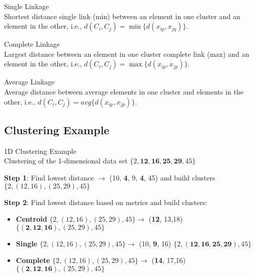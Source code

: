 \begin{definition}{Single Linkage}\\
Shortest distance single link (min) between an element in one cluster and an element in the other, i.e., $d(C_i, C_j) = \min\{d(x_{ip}, x_{jq})\}$.
\end{definition}

\begin{definition}{Complete Linkage}\\
Largest distance between an element in one cluster complete link (max) and an element in the other, i.e., $d(C_i, C_j) = \max\{d(x_{ip}, x_{jp})\}$.
\end{definition}

\begin{definition}{Average Linkage}\\
Average distance between average elements in one cluster and elements in the other, i.e., $d(C_i, C_j) = avg\{d(x_{ip}, x_{jp})\}$.
\end{definition}

\subsection{Clustering Example}

\begin{example2}{1D Clustering Example}\\
Clustering of the 1-dimensional data set $\{2, \mathbf{12}, \mathbf{16}, \mathbf{25}, \mathbf{29}, 45\}$

\textbf{Step 1}: Find lowest distance $\rightarrow$ (10, \textbf{4}, 9, \textbf{4}, 45) and build clusters
$\{2, (12,16), (25,29), 45\}$

\textbf{Step 2}: Find lowest distance based on metrics and build clusters:
\begin{itemize}
    \item \textbf{Centroid} $\{2, (12,16), (25,29), 45\} \rightarrow$ (\textbf{12}, 13,18)
    $\{(\mathbf{2}, \mathbf{12}, \mathbf{16}), (25,29), 45\}$
    
    \item \textbf{Single} $\{2, (12,16), (25,29), 45\} \rightarrow$ (10, \textbf{9}, 16)
    $\{2, (\mathbf{12}, \mathbf{16}, \mathbf{25}, \mathbf{29}), 45\}$
    
    \item \textbf{Complete} $\{2, (12,16), (25,29), 45\} \rightarrow$ (\textbf{14}, 17,16)
    $\{(\mathbf{2}, \mathbf{12}, \mathbf{16}), (25,29), 45\}$
\end{itemize}
\end{example2}

